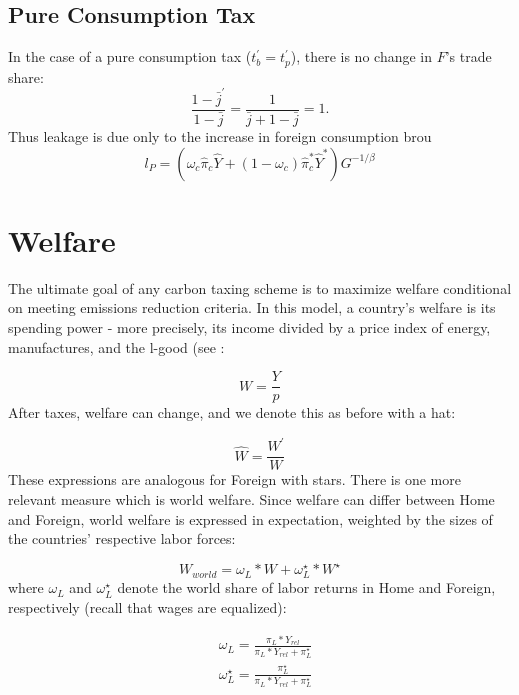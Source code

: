 \documentclass[notitlepage,12pt]{article}
\begin{document}
\subsection{Pure Consumption Tax}

In the case of a pure consumption tax ($t_{b}^{\prime }=t_{p}^{\prime }$),
there is no change in $F$'s trade share:%
\begin{equation*}
\frac{1-\bar{j}^{\prime }}{1-\bar{j}}=\frac{1}{\bar{j}+1-\bar{j}}=1.
\end{equation*}%
Thus leakage is due only to the increase in foreign consumption brou%
\begin{equation*}
l_{P}=\left( \omega _{c}\hat{\pi}_{c}\hat{Y}+\left( 1-\omega _{c}\right) 
\hat{\pi}_{c}^{\ast }\hat{Y}^{\ast }\right) G^{-1/\beta }
\end{equation*}

\section{Welfare}

The ultimate goal of any carbon taxing scheme is to maximize welfare conditional on meeting emissions reduction criteria. In this model, a country's welfare is its spending power - more precisely, its income divided by a price index of energy, manufactures, and the l-good (see :

\begin{equation*}
W = \frac{Y}{p}
\end{equation*}
After taxes, welfare can change, and we denote this as before with a hat:

\begin{equation*}
\hat{W} = \frac{W^\prime}{W}
\end{equation*}
These expressions are analogous for Foreign with stars. There is one more relevant measure which is world welfare. Since welfare can differ between Home and Foreign, world welfare is expressed in expectation, weighted by the sizes of the countries' respective labor forces:

\begin{equation}
W_{world} = \omega_L*W + \omega_L^\star*W^\star
\end{equation}
where $\omega_L$ and $\omega_L^\star$ denote the world share of labor returns in Home and Foreign, respectively (recall that wages are equalized):

\begin{align}
&\omega_L = \frac{\pi_L*Y_{rel}}{\pi_L*Y_{rel} + \pi_L^\star}\\
&\omega_L^\star = \frac{\pi_L^\star}{\pi_L*Y_{rel} + \pi_L^\star}
\end{align}
\end{document}
